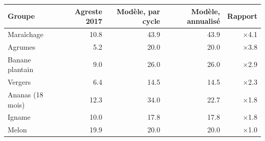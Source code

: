 \begin{tabular}{@{}lrrrr@{}}
  \toprule
  \textbf{Groupe} & \textbf{Agreste 2017} & \textbf{Modèle, par cycle} & \textbf{Modèle, annualisé} & \textbf{Rapport} \\
  \midrule
  Maraîchage & \num{10.8} & \num{43.9} & \num{43.9} & $\times$\num{4.1} \\
  Agrumes & \num{5.2} & \num{20.0} & \num{20.0} & $\times$\num{3.8} \\
  Banane plantain & \num{9.0} & \num{26.0} & \num{26.0} & $\times$\num{2.9} \\
  Vergers & \num{6.4} & \num{14.5} & \num{14.5} & $\times$\num{2.3} \\
  Ananas (18 mois) & \num{12.3} & \num{34.0} & \num{22.7} & $\times$\num{1.8} \\
  Igname & \num{10.0} & \num{17.8} & \num{17.8} & $\times$\num{1.8} \\
  Melon & \num{19.9} & \num{20.0} & \num{20.0} & $\times$\num{1.0} \\
  \bottomrule
\end{tabular}
